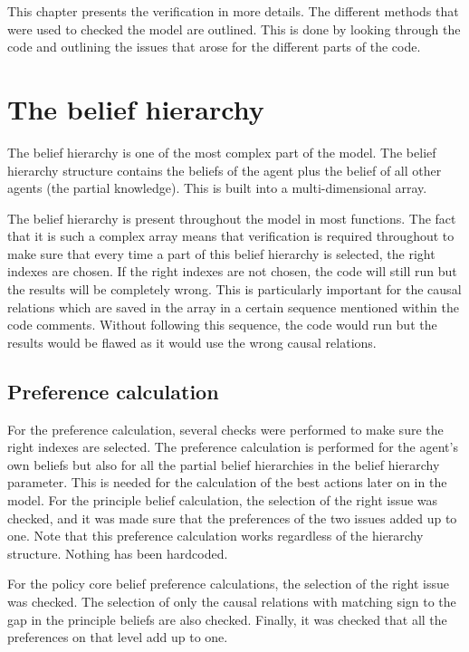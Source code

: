 This chapter presents the verification in more details. The different methods that were used to checked the model are outlined. This is done by looking through the code and outlining the issues that arose for the different parts of the code.

\section{The belief hierarchy}

The belief hierarchy is one of the most complex part of the model. The belief hierarchy structure contains the beliefs of the agent plus the belief of all other agents (the partial knowledge). This is built into a multi-dimensional array.

The belief hierarchy is present throughout the model in most functions. The fact that it is such a complex array means that verification is required throughout to make sure that every time a part of this belief hierarchy is selected, the right indexes are chosen. If the right indexes are not chosen, the code will still run but the results will be completely wrong. This is particularly important for the causal relations which are saved in the array in a certain sequence mentioned within the code comments. Without following this sequence, the code would run but the results would be flawed as it would use the wrong causal relations.

\subsection{Preference calculation}

For the preference calculation, several checks were performed to make sure the right indexes are selected. The preference calculation is performed for the agent's own beliefs but also for all the partial belief hierarchies in the belief hierarchy parameter. This is needed for the calculation of the best actions later on in the model. For the principle belief calculation, the selection of the right issue was checked, and it was made sure that the preferences of the two issues added up to one. Note that this preference calculation works regardless of the hierarchy structure. Nothing has been hardcoded.

For the policy core belief preference calculations, the selection of the right issue was checked. The selection of only the causal relations with matching sign to the gap in the principle beliefs are also checked. Finally, it was checked that all the preferences on that level add up to one.

